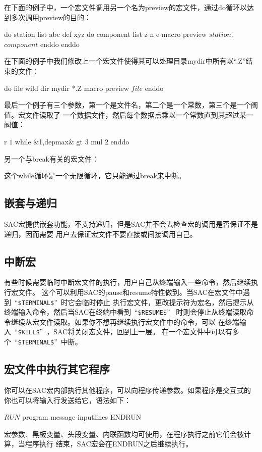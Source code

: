 在下面的例子中，一个宏文件调用另一个名为preview的宏文件，通过do循环以达到多次调用preview的目的：
\begin{SACCode}
do station list abc def xyz
    do component list z n e
        macro preview $station$.$component$
    enddo
enddo
\end{SACCode}

在下面的例子中我们修改上一个宏文件使得其可以处理目录mydir中所有以``.Z''结束的文件：
\begin{SACCode}
do file wild dir mydir *.Z
    macro preview $file$
enddo 
\end{SACCode}

最后一个例子有三个参数，第一个是文件名，第二个是一个常数，第三个是一个阀值。宏文件读取了
一个数据文件，然后每个数据点乘以一个常数直到其超过某一阀值：
\begin{SACCode}
r $1$
while &1,depmax& gt $3$
    mul $2$
enddo 
\end{SACCode}

另一个与break有关的宏文件：
这个while循环是一个无限循环，它只能通过break来中断。

\subsection{嵌套与递归}
SAC宏提供嵌套功能，不支持递归，但是SAC并不会去检查宏的调用是否保证不是递归，因而需要
用户去保证宏文件不要直接或间接调用自己。

\subsection{中断宏}
有些时候需要临时中断宏文件的执行，用户自己从终端输入一些命令，然后继续执行宏文件。
这个可以利用SAC的pause和resume特性做到。当SAC在宏文件中遇到~``\lstinline{$TERMINAL$}''~时它会临时停止
执行宏文件，更改提示符为宏名，然后提示从终端输入命令，然后当SAC在终端中看到~``\lstinline{$RESUME$}''~
时则会停止从终端读取命令继续从宏文件读取。如果你不想再继续执行宏文件中的命令，可以
在终端输入~``\lstinline{$KILL$}''~，SAC将关闭宏文件，回到上一层。
在一个宏文件中可以有多个~``\lstinline{$TERMINAL$}''~中断。

\subsection{宏文件中执行其它程序}
你可以在SAC宏内部执行其他程序，可以向程序传递参数。如果程序是交互式的
你也可以将输入行发送给它，语法如下：
\begin{SACCode}
$RUN$ program message
inputlines
ENDRUN
\end{SACCode}
宏参数、黑板变量、头段变量、内联函数均可使用，在程序执行之前它们会被计算，当程序执行
结束，SAC宏会在ENDRUN之后继续执行。

